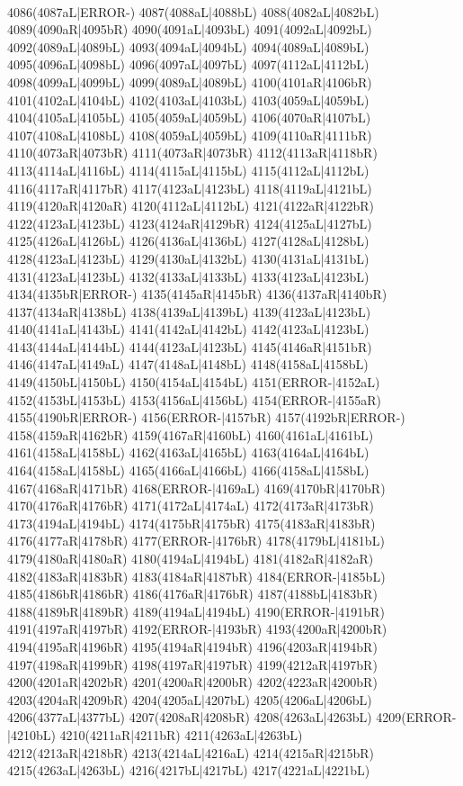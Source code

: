 \\4086(4087aL|ERROR-) 4087(4088aL|4088bL) 4088(4082aL|4082bL) 4089(4090aR|4095bR) 4090(4091aL|4093bL) 4091(4092aL|4092bL) 4092(4089aL|4089bL) 4093(4094aL|4094bL) 4094(4089aL|4089bL) \\4095(4096aL|4098bL) 4096(4097aL|4097bL) 4097(4112aL|4112bL) 4098(4099aL|4099bL) 4099(4089aL|4089bL) 4100(4101aR|4106bR) 4101(4102aL|4104bL) 4102(4103aL|4103bL) 4103(4059aL|4059bL) \\4104(4105aL|4105bL) 4105(4059aL|4059bL) 4106(4070aR|4107bL) 4107(4108aL|4108bL) 4108(4059aL|4059bL) 4109(4110aR|4111bR) 4110(4073aR|4073bR) 4111(4073aR|4073bR) 4112(4113aR|4118bR) \\4113(4114aL|4116bL) 4114(4115aL|4115bL) 4115(4112aL|4112bL) 4116(4117aR|4117bR) 4117(4123aL|4123bL) 4118(4119aL|4121bL) 4119(4120aR|4120aR) 4120(4112aL|4112bL) 4121(4122aR|4122bR) \\4122(4123aL|4123bL) 4123(4124aR|4129bR) 4124(4125aL|4127bL) 4125(4126aL|4126bL) 4126(4136aL|4136bL) 4127(4128aL|4128bL) 4128(4123aL|4123bL) 4129(4130aL|4132bL) 4130(4131aL|4131bL) \\4131(4123aL|4123bL) 4132(4133aL|4133bL) 4133(4123aL|4123bL) 4134(4135bR|ERROR-) 4135(4145aR|4145bR) 4136(4137aR|4140bR) 4137(4134aR|4138bL) 4138(4139aL|4139bL) 4139(4123aL|4123bL) \\4140(4141aL|4143bL) 4141(4142aL|4142bL) 4142(4123aL|4123bL) 4143(4144aL|4144bL) 4144(4123aL|4123bL) 4145(4146aR|4151bR) 4146(4147aL|4149aL) 4147(4148aL|4148bL) 4148(4158aL|4158bL) \\4149(4150bL|4150bL) 4150(4154aL|4154bL) 4151(ERROR-|4152aL) 4152(4153bL|4153bL) 4153(4156aL|4156bL) 4154(ERROR-|4155aR) 4155(4190bR|ERROR-) 4156(ERROR-|4157bR) 4157(4192bR|ERROR-) \\4158(4159aR|4162bR) 4159(4167aR|4160bL) 4160(4161aL|4161bL) 4161(4158aL|4158bL) 4162(4163aL|4165bL) 4163(4164aL|4164bL) 4164(4158aL|4158bL) 4165(4166aL|4166bL) 4166(4158aL|4158bL) \\4167(4168aR|4171bR) 4168(ERROR-|4169aL) 4169(4170bR|4170bR) 4170(4176aR|4176bR) 4171(4172aL|4174aL) 4172(4173aR|4173bR) 4173(4194aL|4194bL) 4174(4175bR|4175bR) 4175(4183aR|4183bR) \\4176(4177aR|4178bR) 4177(ERROR-|4176bR) 4178(4179bL|4181bL) 4179(4180aR|4180aR) 4180(4194aL|4194bL) 4181(4182aR|4182aR) 4182(4183aR|4183bR) 4183(4184aR|4187bR) 4184(ERROR-|4185bL) \\4185(4186bR|4186bR) 4186(4176aR|4176bR) 4187(4188bL|4183bR) 4188(4189bR|4189bR) 4189(4194aL|4194bL) 4190(ERROR-|4191bR) 4191(4197aR|4197bR) 4192(ERROR-|4193bR) 4193(4200aR|4200bR) \\4194(4195aR|4196bR) 4195(4194aR|4194bR) 4196(4203aR|4194bR) 4197(4198aR|4199bR) 4198(4197aR|4197bR) 4199(4212aR|4197bR) 4200(4201aR|4202bR) 4201(4200aR|4200bR) 4202(4223aR|4200bR) \\4203(4204aR|4209bR) 4204(4205aL|4207bL) 4205(4206aL|4206bL) 4206(4377aL|4377bL) 4207(4208aR|4208bR) 4208(4263aL|4263bL) 4209(ERROR-|4210bL) 4210(4211aR|4211bR) 4211(4263aL|4263bL) \\4212(4213aR|4218bR) 4213(4214aL|4216aL) 4214(4215aR|4215bR) 4215(4263aL|4263bL) 4216(4217bL|4217bL) 4217(4221aL|4221bL) 